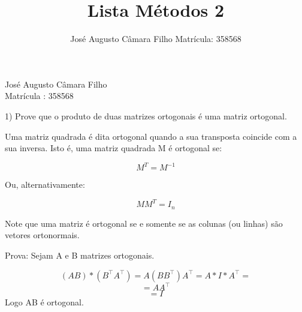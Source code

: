 \documentclass[12pt,a4paper]{article}
\title{Lista Métodos 2}
\author{José Augusto Câmara Filho 
 Matrícula: 358568}
\begin{document}
José Augusto Câmara Filho\\
Matrícula : 358568

1) Prove que o produto de duas matrizes ortogonais é uma matriz ortogonal.


Uma matriz quadrada é dita ortogonal quando a sua transposta coincide com a sua inversa. Isto é, uma matriz quadrada M é ortogonal se:

$$M^T=M^{-1}$$

Ou, alternativamente:

$$MM^T=I_n$$

Note que uma matriz é ortogonal se e somente se as colunas (ou linhas) são vetores ortonormais.
 
Prova: Sejam A e B matrizes ortogonais.

$$(AB)*(B^\top A^\top)= A(BB^\top) A^\top = A*I*A^\top =$$
$$=AA^\top$$
$$=I$$
Logo AB é ortogonal.
\end{document}
